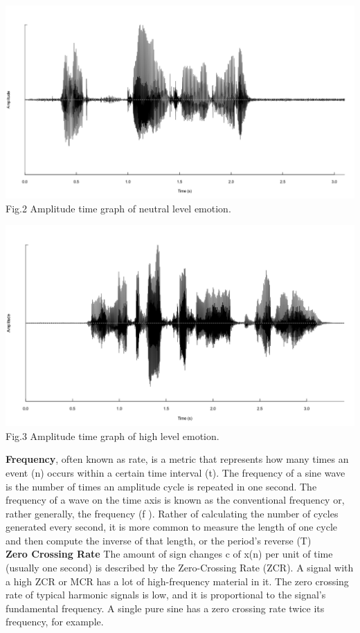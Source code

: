\documentclass[11pt,a4paper]{article}
\begin{document}
      \begin{center}
	
	\includegraphics[scale=0.20]{LEVEL_1.png} \\ 
	Fig.2 Amplitude time graph of neutral level emotion. \\
	
\end{center} 
      \begin{center}
	
	\includegraphics[scale=0.20]{LEVEL_2.png} \\ 
	Fig.3 Amplitude time graph of high level emotion. \\
	
\end{center} 
	\textbf{Frequency}, often known as rate, is a metric that represents how many times an event (n) occurs within a certain time interval (t). The frequency of a sine wave is the number of times an amplitude cycle is repeated in one second. The frequency of a wave on the time axis is known as the conventional frequency or, rather generally, the frequency (f ). Rather of calculating the number of cycles generated every second, it is more common to measure the length of one cycle and then compute the inverse of that length, or the period's reverse (T) \\ 
	\textbf{Zero Crossing Rate} The amount of sign changes c of x(n) per unit of time  (usually one second) is described by the Zero-Crossing Rate (ZCR). A signal with a high ZCR or MCR has a lot of high-frequency material in it. The zero crossing rate of typical harmonic signals is low, and it is proportional to the signal's fundamental frequency. A single pure sine has a zero crossing rate twice its frequency, for example. 
\end{document}

